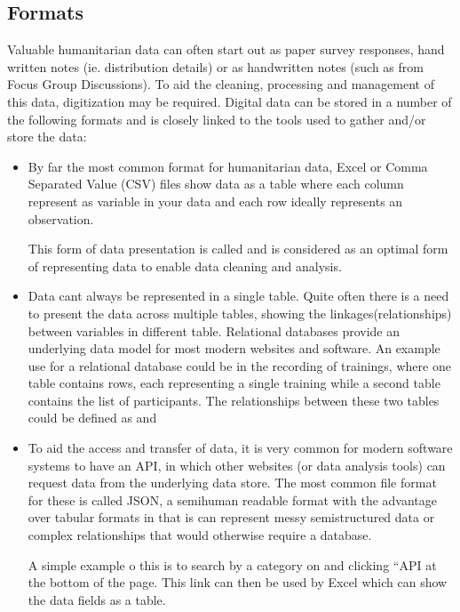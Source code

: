 \documentclass[letterpaper,10pt,english]{jupyterBook}
\begin{document}
\subsection{Formats}
\label{\detokenize{part1/data literacy:formats}}
\sphinxAtStartPar
Valuable humanitarian data can often start out as paper survey responses, hand written notes (ie. distribution details) or as handwritten notes (such as from Focus Group Discussions). To aid the cleaning, processing and management of this data, digitization may be required. Digital data can be stored in a number of the following formats and is closely linked to the tools used to gather and/or store the data:
\begin{itemize}
\item {} 
\sphinxAtStartPar
{} By far the most common format for humanitarian data, Excel or Comma Separated Value (CSV) files show data as a table where each column represent as variable in your data and each row ideally represents an observation. %
\begin{footnote}[3]\sphinxAtStartFootnote
This form of data presentation is called  and is considered as an optimal form of representing data to enable data cleaning and analysis.
%
\end{footnote}

\item {} 
\sphinxAtStartPar
{} Data cant always be represented in a single table. Quite often there is a need to present the data across multiple tables, showing the linkages(relationships) between variables in different table. Relational databases provide an underlying data model for most modern websites and software. An example use for a relational database could be in the recording of trainings, where one table contains rows, each representing a single training while a second table contains the list of participants. The relationships between these two tables could be defined as  and 

\item {} 
\sphinxAtStartPar
{} To aid the access and transfer of data, it is very common for modern software systems to have an API, in which other websites (or data analysis tools) can request data from the underlying data store. The most common file format for these is called JSON, a semi\sphinxhyphen{}human readable format with the advantage over tabular formats in that is can represent messy semi\sphinxhyphen{}structured data or complex relationships that would otherwise require a database. %
\begin{footnote}[4]\sphinxAtStartFootnote
A simple example o this is to search by a category on  and clicking “API at the bottom of the page. This link can then be used by Excel which can show the data fields as a table.
%
\end{footnote}


\end{itemize}
\end{document}

